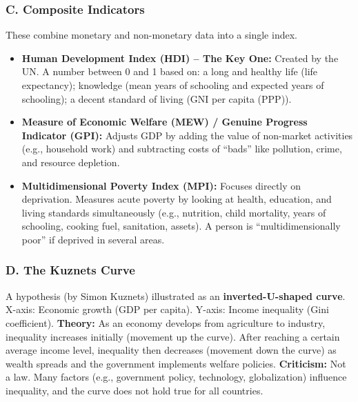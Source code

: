 \documentclass[11pt, a4paper, twoside]{book}
\begin{document}
\subsubsection{C. Composite Indicators}

These combine monetary and non-monetary data into a single index.

\begin{itemize}
  \item \textbf{Human Development Index (HDI) -- The Key One:} Created by the UN. A number between 0 and 1 based on: a long and healthy life (life expectancy); knowledge (mean years of schooling and expected years of schooling); a decent standard of living (GNI per capita (PPP)).
  \item \textbf{Measure of Economic Welfare (MEW) / Genuine Progress Indicator (GPI):} Adjusts GDP by adding the value of non-market activities (e.g., household work) and subtracting costs of ``bads'' like pollution, crime, and resource depletion.
  \item \textbf{Multidimensional Poverty Index (MPI):} Focuses directly on deprivation. Measures acute poverty by looking at health, education, and living standards simultaneously (e.g., nutrition, child mortality, years of schooling, cooking fuel, sanitation, assets). A person is ``multidimensionally poor'' if deprived in several areas.
\end{itemize}

\subsubsection{D. The Kuznets Curve}

A hypothesis (by Simon Kuznets) illustrated as an \textbf{inverted-U-shaped curve}. X-axis: Economic growth (GDP per capita). Y-axis: Income inequality (Gini coefficient). \textbf{Theory:} As an economy develops from agriculture to industry, inequality increases initially (movement up the curve). After reaching a certain average income level, inequality then decreases (movement down the curve) as wealth spreads and the government implements welfare policies. \textbf{Criticism:} Not a law. Many factors (e.g., government policy, technology, globalization) influence inequality, and the curve does not hold true for all countries.
\end{document}
